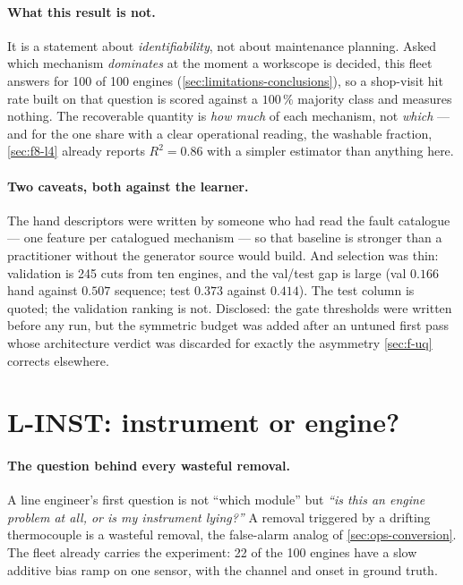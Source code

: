 \paragraph{What this result is not.} It is a statement about \emph{identifiability}, not about
maintenance planning. Asked which mechanism \emph{dominates} at the moment a workscope is
decided, this fleet answers  for 100 of 100 engines
(\cref{sec:limitations-conclusions}), so a shop-visit hit rate built on that question is scored
against a $100\,\%$ majority class and measures nothing. The recoverable quantity is
\emph{how much} of each mechanism, not \emph{which} --- and for the one share with a clear
operational reading, the washable fraction, \cref{sec:f8-l4} already reports $R^2 = 0.86$ with
a simpler estimator than anything here.

\paragraph{Two caveats, both against the learner.} The hand descriptors were written by someone
who had read the fault catalogue --- one feature per catalogued mechanism --- so that baseline
is stronger than a practitioner without the generator source would build. And selection was
thin: validation is 245 cuts from ten engines, and the val/test gap is large (val $0.166$ hand
against $0.507$ sequence; test $0.373$ against $0.414$). The test column is quoted; the
validation ranking is not. Disclosed: the gate thresholds were written before any run, but the
symmetric budget was added after an untuned first pass whose architecture verdict was discarded
for exactly the asymmetry \cref{sec:f-uq} corrects elsewhere.

\section{L-INST: instrument or engine?}
\label{sec:f15-instrument}

\paragraph{The question behind every wasteful removal.} A line engineer's first question is not
``which module'' but \emph{``is this an engine problem at all, or is my instrument lying?''} A
removal triggered by a drifting thermocouple is a wasteful removal, the false-alarm analog of
\cref{sec:ops-conversion}. The fleet already carries the experiment: 22 of the 100 engines have
a slow additive bias ramp on one sensor, with the channel and onset in ground truth.

